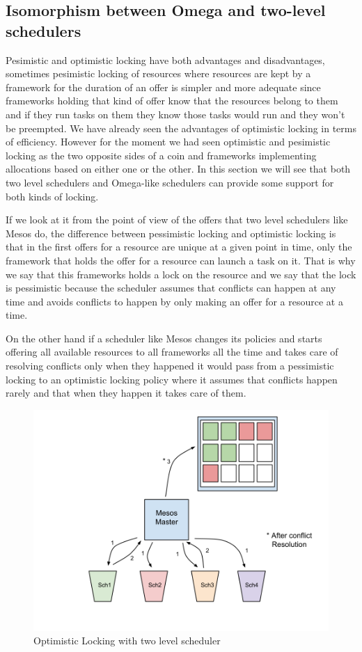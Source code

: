 \documentclass{svjour3}                     %
\begin{document}
\subsection {Isomorphism between Omega and two-level schedulers}

Pesimistic and optimistic locking have both advantages and
disadvantages, sometimes pesimistic locking of resources where
resources are kept by a framework for the duration of an offer is
simpler and more adequate since frameworks holding that kind of offer
know that the resources belong to them and if they run tasks on them
they know those tasks would run and they won't be preempted. We have
already seen the advantages of optimistic locking in terms of
efficiency. However for the moment we had seen optimistic and
pesimistic locking as the two opposite sides of a coin and frameworks
implementing allocations based on either one or the other. In this
section we will see that both two level schedulers and Omega-like
schedulers can provide some support for both kinds of locking.

If we look at it from the point of view of the offers that two level
schedulers like Mesos do, the difference between pessimistic locking
and optimistic locking is that in the first offers for a resource are
unique at a given point in time, only the framework that holds the
offer for a resource can launch a task on it. That is why we say that
this frameworks holds a lock on the resource and we say that the lock
is pessimistic because the scheduler assumes that conflicts can happen
at any time and avoids conflicts to happen by only making an offer for
a resource at a time.

On the other hand if a scheduler like Mesos changes its policies and
starts offering all available resources to all frameworks all the time
and takes care of resolving conflicts only when they happened it would
pass from a pessimistic locking to an optimistic locking policy where
it assumes that conflicts happen rarely and that when they happen it
takes care of them.

\begin{figure}[!ht]
  \centering
  \includegraphics[scale=0.25,natwidth=960,natheight=720]{MesosOptimisticLocking.png}
  \caption{Optimistic Locking with two level scheduler}
  \label{fig:centralized}
\end{figure}
\end{document}
